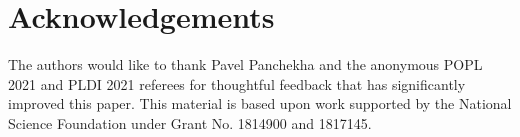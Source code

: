 
\section*{Acknowledgements}

The authors would like to thank
Pavel Panchekha and 
the anonymous POPL 2021 and PLDI 2021 referees 
for thoughtful feedback that has significantly improved this paper. 
This material is based upon work supported by the National Science Foundation 
under Grant No. 1814900 and 1817145. 
